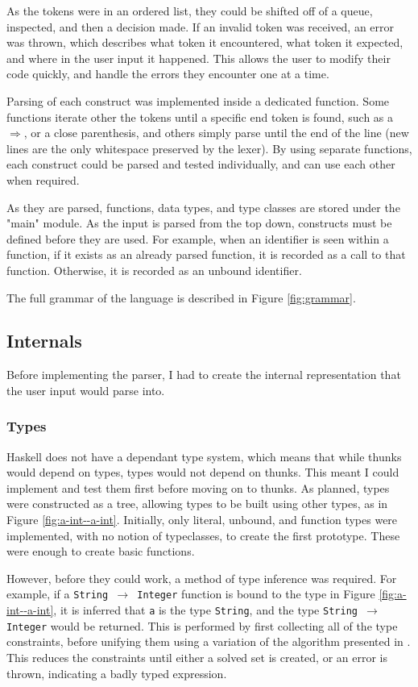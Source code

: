 As the tokens were in an ordered list, they could be shifted off of a queue, inspected, and then a decision made. If an invalid token was received, an error was thrown, which describes what token it encountered, what token it expected, and where in the user input it happened. This allows the user to modify their code quickly, and handle the errors they encounter one at a time.

Parsing of each construct was implemented inside a dedicated function. Some functions iterate other the tokens until a specific end token is found, such as a $\Rightarrow$, or a close parenthesis, and others simply parse until the end of the line (new lines are the only whitespace preserved by the lexer). By using separate functions, each construct could be parsed and tested individually, and can use each other when required.

As they are parsed, functions, data types, and type classes are stored under the "main" module. As the input is parsed from the top down, constructs must be defined before they are used. For example, when an identifier is seen within a function, if it exists as an already parsed function, it is recorded as a call to that function. Otherwise, it is recorded as an unbound identifier.

The full grammar of the language is described in Figure \ref{fig:grammar}.

\subsection{Internals} \label{internals}
Before implementing the parser, I had to create the internal representation that the user input would parse into.

\subsubsection{Types}

Haskell does not have a dependant type system, which means that while thunks would depend on types, types would not depend on thunks. This meant I could implement and test them first before moving on to thunks. As planned, types were constructed as a tree, allowing types to be built using other types, as in Figure \ref{fig:a-int--a-int}. Initially, only literal, unbound, and function types were implemented, with no notion of typeclasses, to create the first prototype. These were enough to create basic functions.

However, before they could work, a method of type inference was required. For example, if a {\tt String $\rightarrow$ Integer} function is bound to the type in Figure \ref{fig:a-int--a-int}, it is inferred that {\tt a} is the type {\tt String}, and the type {\tt String $\rightarrow$ Integer} would be returned. This is performed by first collecting all of the type constraints, before unifying them using a variation of the algorithm presented in \cite{unification}. This reduces the constraints until either a solved set is created, or an error is thrown, indicating a badly typed expression.

